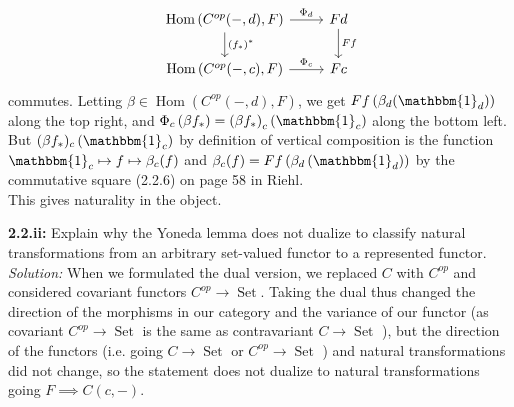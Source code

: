 \documentclass[a4paper]{article}
\DeclareMathOperator{\Hom}{Hom}
\DeclareMathOperator{\Set}{Set}
\begin{document}
     \begin{equation*}
    \begin{tikzcd}
        \Hom\left( C^{op}(-,d),F \right) \arrow[r, "\Phi_d"] \arrow[d, "(f_*)^{*}"] &
        Fd \arrow[d, "Ff"] \\
        \Hom\left( C^{op}(-,c),F \right) \arrow[r, "\Phi_c"] & Fc
    \end{tikzcd}
    \end{equation*}
    commutes. Letting
    $\beta \in \Hom\left( C^{op}(-,d),F \right) $, we get
    $Ff \left( \beta_d (\mathbbm{1}_d) \right) $ along the top right, and
    $\Phi_c \left( \beta f_* \right) 
    = \left( \beta f_* \right)_c \left( \mathbbm{1}_c \right) $ along the
    bottom left. But
    $(\beta f_*)_c \left( \mathbbm{1}_c \right) $ by definition of vertical
    composition is the function
    $\mathbbm{1}_c \mapsto f \mapsto \beta_c (f)$ and
    $\beta_c (f) = Ff \left( \beta_d \left( \mathbbm{1}_d \right)  \right) $
    by the commutative square (2.2.6) on page 58 in Riehl.\\
    This gives naturality in the object.\\
    \linebreak
    
    
    



    



    \textbf{2.2.ii:} Explain why the Yoneda lemma does not dualize to classify
    natural transformations from an arbitrary set-valued functor to
    a represented functor.\\
    \linebreak
    \textit{Solution:}
    When we formulated the dual version, we replaced $C$ with $C^{op}$ and
    considered covariant functors $C^{op} \to \Set$. Taking the dual
    thus changed the direction of the morphisms in our category and
    the variance of our functor (as covariant $C^{op}\to \Set$ is the same as
    contravariant $C \to \Set$ ), but the direction of the functors
    (i.e. going $C \to \Set$ or $C^{op}\to \Set$ ) and natural
    transformations did not change, so the statement does not dualize to natural
    transformations going
    $F \implies C(c,-)$.
    
    
    
    
\end{document}
